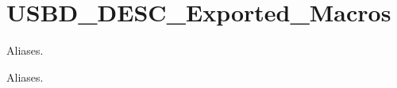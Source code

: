 \hypertarget{group__USBD__DESC__Exported__Macros}{}\section{U\+S\+B\+D\+\_\+\+D\+E\+S\+C\+\_\+\+Exported\+\_\+\+Macros}
\label{group__USBD__DESC__Exported__Macros}


Aliases.  


Aliases. 

